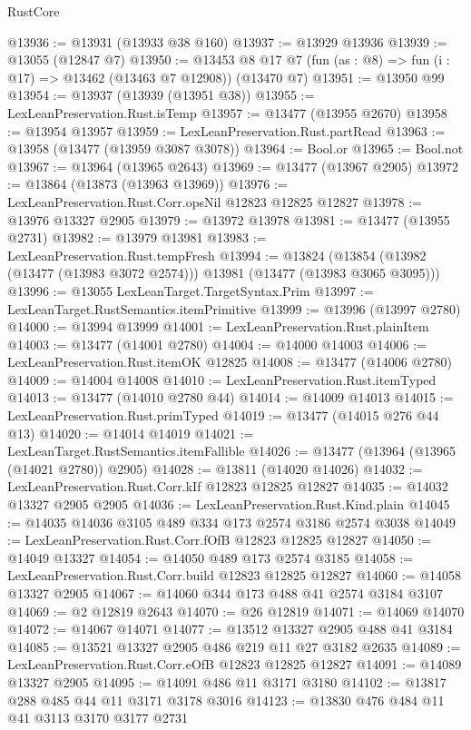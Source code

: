 \begin{lexlean}{RustCore}
\begin{coremodule}
@13936 := @13931 (@13933 @38 @160)
@13937 := @13929 @13936
@13939 := @13055 (@12847 @7)
@13950 := @13453 @8 @17 @7 (fun (as : @8) => fun (i : @17) => @13462 (@13463 @7 @12908)) (@13470 @7)
@13951 := @13950 @99
@13954 := @13937 (@13939 (@13951 @38))
@13955 := LexLeanPreservation.Rust.isTemp
@13957 := @13477 (@13955 @2670)
@13958 := @13954 @13957
@13959 := LexLeanPreservation.Rust.partRead
@13963 := @13958 (@13477 (@13959 @3087 @3078))
@13964 := Bool.or
@13965 := Bool.not
@13967 := @13964 (@13965 @2643)
@13969 := @13477 (@13967 @2905)
@13972 := @13864 (@13873 (@13963 @13969))
@13976 := LexLeanPreservation.Rust.Corr.opsNil @12823 @12825 @12827
@13978 := @13976 @13327 @2905
@13979 := @13972 @13978
@13981 := @13477 (@13955 @2731)
@13982 := @13979 @13981
@13983 := LexLeanPreservation.Rust.tempFresh
@13994 := @13824
    (@13854 (@13982 (@13477 (@13983 @3072 @2574))) @13981 (@13477 (@13983 @3065 @3095)))
@13996 := @13055 LexLeanTarget.TargetSyntax.Prim
@13997 := LexLeanTarget.RustSemantics.itemPrimitive
@13999 := @13996 (@13997 @2780)
@14000 := @13994 @13999
@14001 := LexLeanPreservation.Rust.plainItem
@14003 := @13477 (@14001 @2780)
@14004 := @14000 @14003
@14006 := LexLeanPreservation.Rust.itemOK @12825
@14008 := @13477 (@14006 @2780)
@14009 := @14004 @14008
@14010 := LexLeanPreservation.Rust.itemTyped
@14013 := @13477 (@14010 @2780 @44)
@14014 := @14009 @14013
@14015 := LexLeanPreservation.Rust.primTyped
@14019 := @13477 (@14015 @276 @44 @13)
@14020 := @14014 @14019
@14021 := LexLeanTarget.RustSemantics.itemFallible
@14026 := @13477 (@13964 (@13965 (@14021 @2780)) @2905)
@14028 := @13811 (@14020 @14026)
@14032 := LexLeanPreservation.Rust.Corr.kIf @12823 @12825 @12827
@14035 := @14032 @13327 @2905 @2905
@14036 := LexLeanPreservation.Rust.Kind.plain
@14045 := @14035 @14036 @3105 @489 @334 @173 @2574 @3186 @2574 @3038
@14049 := LexLeanPreservation.Rust.Corr.fOfB @12823 @12825 @12827
@14050 := @14049 @13327
@14054 := @14050 @489 @173 @2574 @3185
@14058 := LexLeanPreservation.Rust.Corr.build @12823 @12825 @12827
@14060 := @14058 @13327 @2905
@14067 := @14060 @344 @173 @488 @41 @2574 @3184 @3107
@14069 := @2 @12819 @2643
@14070 := @26 @12819
@14071 := @14069 @14070
@14072 := @14067 @14071
@14077 := @13512 @13327 @2905 @488 @41 @3184
@14085 := @13521 @13327 @2905 @486 @219 @11 @27 @3182 @2635
@14089 := LexLeanPreservation.Rust.Corr.eOfB @12823 @12825 @12827
@14091 := @14089 @13327 @2905
@14095 := @14091 @486 @11 @3171 @3180
@14102 := @13817 @288 @485 @44 @11 @3171 @3178 @3016
@14123 := @13830
    @476
    @484
    @11
    @41
    @3113
    @3170
    @3177
    @2731

\end{coremodule}
\end{lexlean}
